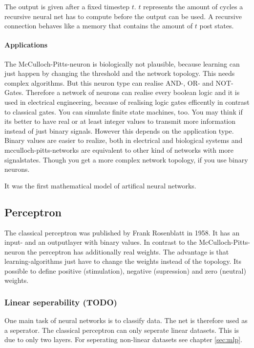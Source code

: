 \documentclass[10pt,a4paper,DIV=11]{scrreprt}
\begin{document}
The output is given after a fixed timestep $t$. $t$ represents the amount of cycles a recursive neural net has to compute before the output can be used. A recursive connection behaves like a memory that contains the amount of $t$ post states.

\paragraph{Applications}
The McCulloch-Pitts-neuron is biologically not plausible, because learning
can just happen by changing the threshold and the network topology. This needs complex algorithms.
But this neuron type can realise AND-, OR- and NOT-Gates.
Therefore a network of neurons can realise every boolean logic and it is used in electrical engineering, because of realising logic gates efficently in contrast to classical gates. You can simulate finite state machines, too.
You may think if its better to have real or at least integer values to transmit more information instead of just binary signals. However this depends on the application type. Binary values are easier to realize, both in electrical and biological systems and mcculloch-pitts-networks are equivalent to other kind of networks with more signalstates. Though you get a more complex network topology, if you use binary neurons.

It was the first mathematical model of artifical neural networks.\cite{NEURONMATH}


\subsection{Perceptron}
The classical perceptron was published by Frank Rosenblatt in 1958.
It has an input- and an outputlayer with binary values. In contrast to the McCulloch-Pitts-neuron
the perceptron has additionally real weights. The advantage is that learning-algorithms just have to change the weights instead of the topology. Its possible to define positive (stimulation), negative (supression) and zero (neutral) weights.

\subsubsection*{Linear seperability (TODO)}
One main task of neural networks is to classify data. The net is therefore used as a seperator.
The classical perceptron can only seperate linear datasets. This is due to only two layers. For seperating non-linear datasets see chapter \ref{sec:mlp}.
\end{document}
